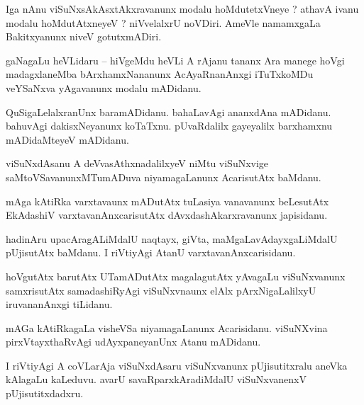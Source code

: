 \documentclass{article}
\begin{document}
\begin{mn}%
Iga nAnu viSuNxsAkAsxtAkxravanunx modalu hoMdutetxVneye ? athavA ivanu modalu hoMdutAtxneyeV ? 
niVvelalxrU noVDiri. AmeVle namamxgaLa Bakitxyanunx niveV gotutxmADiri.
\end{mn}

\begin{mn}%
gaNagaLu heVLidaru -- hiVgeMdu heVLi A rAjanu tananx Ara manege hoVgi  madagxlaneMba 
bArxhamxNananunx AcAyaRnanAnxgi iTuTxkoMDu veYSaNxva yAgavanunx modalu mADidanu.
\end{mn}

\begin{mn}%
QuSigaLelalxranUnx baramADidanu. bahaLavAgi ananxdAna mADidanu. bahuvAgi dakisxNeyanunx koTaTxnu. 
pUvaRdalilx gayeyalilx barxhamxnu mADidaMteyeV mADidanu.
\end{mn}

\begin{mn}%
viSuNxdAsanu A deVvasAthxnadalilxyeV niMtu viSuNxvige saMtoVSavanunxMTumADuva niyamagaLanunx 
AcarisutAtx baMdanu.
\end{mn}

\begin{mn}%
mAga kAtiRka varxtavaunx mADutAtx tuLasiya vanavanunx beLesutAtx EkAdashiV varxtavanAnxcarisutAtx 
dAvxdashAkarxravanunx japisidanu.
\end{mn}

\begin{mn}%
hadinAru upacAragALiMdalU naqtayx, giVta, maMgaLavAdayxgaLiMdalU pUjisutAtx baMdanu. I riVtiyAgi 
AtanU varxtavanAnxcarisidanu.
\end{mn}

\begin{mn}%
hoVgutAtx barutAtx UTamADutAtx magalagutAtx yAvagaLu viSuNxvanunx samxrisutAtx samadashiRyAgi 
viSuNxvnaunx elAlx pArxNigaLalilxyU iruvananAnxgi tiLidanu.
\end{mn}

\begin{mn}%
mAGa kAtiRkagaLa visheVSa niyamagaLanunx Acarisidanu. viSuNXvina pirxVtayxthaRvAgi udAyxpaneyanUnx 
Atanu mADidanu.
\end{mn}

\begin{mn}%
I riVtiyAgi A coVLarAja viSuNxdAsaru  viSuNxvanunx pUjisutitxralu aneVka kAlagaLu kaLeduvu. avarU 
savaRparxkAradiMdalU viSuNxvanenxV pUjisutitxdadxru.
\end{mn}

\end{document}
